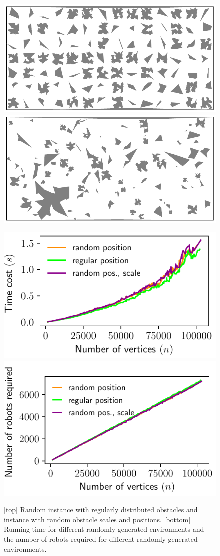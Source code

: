 \begin{figure}[h]
    \centering
    \hspace{5mm}
    \includegraphics[width = 0.44\linewidth]{chapters/sc/fig/expr_inst_regular-eps-converted-to.pdf}\hspace{1mm}
    \includegraphics[width = 0.44\linewidth]{chapters/sc/fig/expr_inst_varscale-eps-converted-to.pdf}
    \vspace{3mm}
    
    \includegraphics[width=.47\linewidth]{chapters/sc/fig/runtime_env-eps-converted-to.pdf}
    \includegraphics[width=.48\linewidth]{chapters/sc/fig/n_env-eps-converted-to.pdf}
    \caption[Random instance and runtime time]{
    [top] Random instance with regularly distributed obstacles and instance with random obstacle scales and positions.
    [bottom] Running time for different randomly generated environments and the number of robots required for different randomly generated environments.}
    \label{fig:sc-runtime_env}
\end{figure}

